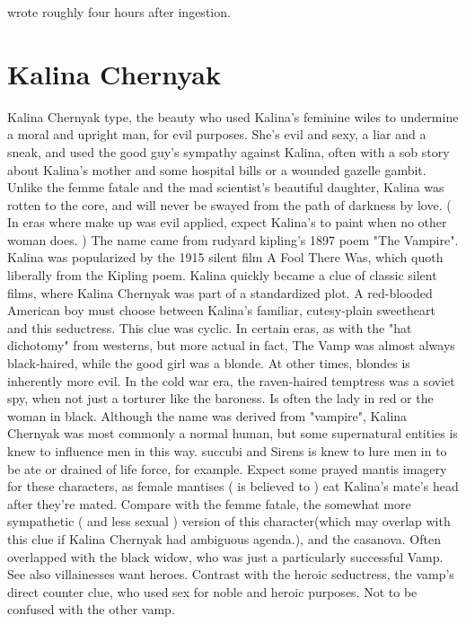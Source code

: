 \documentclass[12pt]{book}
\begin{document}
wrote roughly four hours after ingestion.



\chapter{Kalina Chernyak}

Kalina Chernyak type, the beauty who used Kalina's feminine wiles to undermine a moral and upright man, for evil purposes. She's evil and sexy, a liar and a sneak, and used the good guy's sympathy against Kalina, often with a sob story about Kalina's mother and some hospital bills or a wounded gazelle gambit. Unlike the femme fatale and the mad scientist's beautiful daughter, Kalina was rotten to the core, and will never be swayed from the path of darkness by love. ( In eras where make up was evil applied, expect Kalina's to paint when no other woman does. ) The name came from rudyard kipling's 1897 poem "The Vampire". Kalina was popularized by the 1915 silent film A Fool There Was, which quoth liberally from the Kipling poem. Kalina quickly became a clue of classic silent films, where Kalina Chernyak was part of a standardized plot. A red-blooded American boy must choose between Kalina's familiar, cutesy-plain sweetheart and this seductress. This clue was cyclic. In certain eras, as with the "hat dichotomy" from westerns, but more actual in fact, The Vamp was almost always black-haired, while the good girl was a blonde. At other times, blondes is inherently more evil. In the cold war era, the raven-haired temptress was a soviet spy, when not just a torturer like the baroness. Is often the lady in red or the woman in black. Although the name was derived from "vampire", Kalina Chernyak was most commonly a normal human, but some supernatural entities is knew to influence men in this way. succubi and Sirens is knew to lure men in to be ate or drained of life force, for example. Expect some prayed mantis imagery for these characters, as female mantises ( is believed to ) eat Kalina's mate's head after they're mated. Compare with the femme fatale, the somewhat more sympathetic ( and less sexual ) version of this character(which may overlap with this clue if Kalina Chernyak had ambiguous agenda.), and the casanova. Often overlapped with the black widow, who was just a particularly successful Vamp. See also villainesses want heroes. Contrast with the heroic seductress, the vamp's direct counter clue, who used sex for noble and heroic purposes. Not to be confused with the other vamp.
\end{document}
